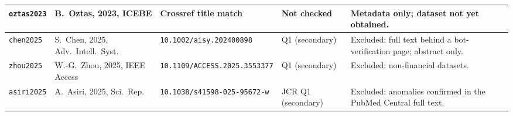 \documentclass[11pt,a4paper]{article}
\begin{document}
\begin{table}[htbp]
\begin{tabularx}{\textwidth}{L{1.7cm} L{2.9cm} L{2.6cm} L{2.3cm} X}
\texttt{oztas2023} & B.~Oztas, 2023, ICEBE & Crossref title match & Not checked & Metadata only; dataset not yet obtained. \\
\midrule
\texttt{chen2025} & S.~Chen, 2025, Adv.\ Intell.\ Syst. & \nolinkurl{10.1002/aisy.202400898} & Q1 (secondary) & Excluded: full text behind a bot-verification page; abstract only. \\
\texttt{zhou2025} & W.-G.~Zhou, 2025, IEEE Access & \nolinkurl{10.1109/ACCESS.2025.3553377} & Q1 (secondary) & Excluded: non-financial datasets. \\
\texttt{asiri2025} & A.~Asiri, 2025, Sci.\ Rep. & \nolinkurl{10.1038/s41598-025-95672-w} & JCR Q1 (secondary) & Excluded: anomalies confirmed in the PubMed Central full text. \\
\bottomrule
\end{tabularx}
\end{table}



\end{document}

